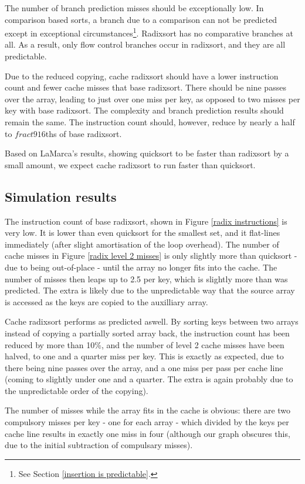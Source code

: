 The number of branch prediction misses should be exceptionally low. In
comparison based sorts, a branch due to a comparison can not be predicted except
in exceptional circumstances\footnote{See Section \ref{insertion is
predictable}.}. Radixsort has no comparative branches at all. As a result, only
flow control branches occur in radixsort, and they are all predictable.

Due to the reduced copying, cache radixsort should have a lower instruction
count and fewer cache misses that base radixsort. There should be nine passes
over the array, leading to just over one miss per key, as opposed to two misses
per key with base radixsort. The complexity and branch prediction results
should remain the same. The instruction count should, however, reduce by nearly
a half to $fract{9}{16}$ths of base radixsort.

Based on LaMarca's results, showing quicksort to be faster than radixsort by a
small amount, we expect cache radixsort to run faster than quicksort.

\subsection{Simulation results}

The instruction count of base radixsort, shown in Figure \ref{radix instructions} is
very low. It is lower than even quicksort for the smallest set, and it
flat-lines immediately (after slight amortisation of the loop overhead). The
number of cache misses in Figure \ref{radix level 2 misses} is only slightly
more than quicksort - due to being out-of-place - until the array no longer fits
into the cache. The number of misses then leaps up to 2.5 per key, which is
slightly more than was predicted. The extra is likely due to the unpredictable
way that the source array is accessed as the keys are copied to the auxilliary
array.

Cache radixsort performs as predicted aswell. By sorting keys between two
arrays instead of copying a partially sorted array back, the instruction count
has been reduced by more than 10\%, and the number of level 2 cache misses
have been halved, to one and a quarter miss per key. This is exactly
as expected, due to there being nine passes over the array, and a one miss
per pass per cache line (coming to slightly under one and a quarter. The extra
is again probably due to the unpredictable order of the copying).

The number of misses while the array fits in the cache is obvious: there
are two compulsory misses per key - one for each array - which divided by the
keys per cache line results in exactly one miss in four (although our graph
obscures this, due to the initial subtraction of compulsary misses).

